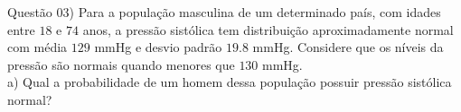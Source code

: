 
\noindent \textcolor{COLOR1}{Questão 03)} Para a população masculina de um determinado país, com idades entre $18$ e $74$ anos, a pressão sistólica tem distribuição aproximadamente normal com média $129$ mmHg e desvio padrão $19.8$ mmHg. Considere que os níveis da pressão são normais quando menores que $130$ mmHg.
\\

a) Qual a probabilidade de um homem dessa população possuir pressão sistólica normal?